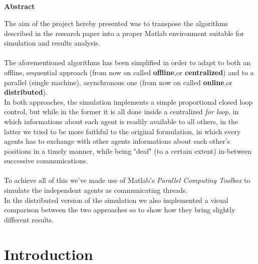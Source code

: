\documentclass[a4paper,11pt,oneside]{book}
\begin{document}
	
	\newpage
	\thispagestyle{empty}
	
	
	
	\begin{center}
		\chapter*{}
		\thispagestyle{empty}
		{\Huge \textbf{Abstract}}\\
		\vspace{15mm}
	\end{center}
	The aim of the project hereby presented was to transpose the algorithms described in the research paper\cite{K1} into a proper Matlab environment suitable for simulation and results analysis.\\\\
	
	The aforementioned algorithms has been simplified in order to adapt to both an offline, sequential approach (from now on called \textbf{offline},or \textbf{centralized}) and to a parallel (single machine), asynchronous one (from now on called \textbf{online},or \textbf{distributed}).\\
	In both approaches, the simulation implements a simple proportional closed loop control, but while in the former it is all done inside a centralized \textit{for loop}, in which informations about each agent is readily available to all others, in the latter we tried to be more faithful to the original formulation, in which every agents has to exchange with other agents informations about each other's positions in a timely manner, while being "deaf" (to a certain extent) in-between successive communications.\\\\
	
	To achieve all of this we've made use of Matlab's \textit{Parallel Computing Toolbox} to simulate the independent agents as communicating threads.\\
	In the distributed version of the simulation we also implemented a visual comparison between the two approaches so to show how they bring slightly different results.
	
	
	
	\tableofcontents \thispagestyle{empty}
	\listoffigures\thispagestyle{empty}
	
	\chapter*{Introduction}
	
\end{document}
